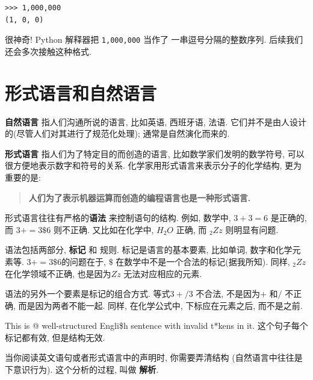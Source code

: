 \documentclass[10pt]{book}
\begin{document}
\begin{verbatim}
>>> 1,000,000
(1, 0, 0)
\end{verbatim}
%

很神奇! Python 解释器把 {\tt 1,000,000} 当作了
一串逗号分隔的整数序列. 后续我们还会多次接触这种格式. 




\section{形式语言和自然语言}

{\bf 自然语言} 指人们沟通所说的语言, 比如英语, 西班牙语, 法语. 
它们并不是由人设计的(尽管人们对其进行了规范化处理); 通常是自然演化而来的. 


{\bf 形式语言} 指人们为了特定目的而创造的语言, 
比如数学家们发明的数学符号, 
可以很方便地表示数字和符号的关系. 
化学家用形式语言来表示分子的化学结构, 更为重要的是:

\begin{quote}
{\bf 人们为了表示机器运算而创造的编程语言也是一种形式语言. }
\end{quote}

形式语言往往有严格的{\bf 语法} 来控制语句的结构. 例如, 
数学中, $3 + 3 = 6$ 是正确的, 而 $3 + = 3 \$ 6$ 则不正确. 
又比如在化学中, $H_2O$ 正确, 而 $_2Zz$ 则明显有问题. 

语法包括两部分, {\bf 标记} 和 规则. 
标记是语言的基本要素, 比如单词, 数字和化学元素等. 
$3 += 3 \$ 6$的问题在于, \(\$\) 在数学中不是一个合法的标记(据我所知). 
同样, $_2Zz$ 在化学领域不正确, 也是因为$Zz$ 无法对应相应的元素. 

语法的另外一个要素是标记的组合方式. 
等式$3 +/ 3$ 不合法, 不是因为$+$ 和$/$ 不正确, 而是因为两者不能一起. 
同样, 在化学公式中, 下标应在元素之后, 而不是之前. 

This is @ well-structured Engli\$h
sentence with invalid t*kens in it. 这个句子每个标记都有效, 
但是结构无效. 

当你阅读英文语句或者形式语言中的声明时, 
你需要弄清结构
(自然语言中往往是下意识行为). 这个分析的过程, 叫做 {\bf 解析}. 
\end{document}
